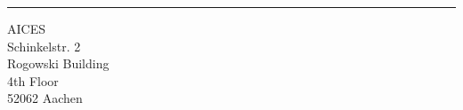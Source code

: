 
\noindent\rule[2pt]{\textwidth}{0.5pt}
\begin{center}
    AICES\\
    Schinkelstr. 2\\
    Rogowski Building\\
    4th Floor\\
    52062 Aachen    
\end{center}
\vspace*{\fill}

